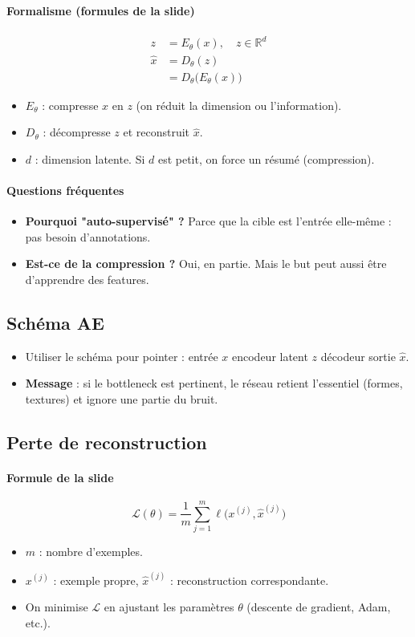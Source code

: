 \documentclass[11pt,a4paper]{article}
\newcommand{\R}{\mathbb{R}}
\begin{document}
\paragraph{Formalisme (formules de la slide)}
\begin{align*}
  z &= E_\theta(x), \quad z \in \R^d \\
  \hat{x} &= D_\theta(z) \\
         &= D_\theta\big(E_\theta(x)\big)
\end{align*}
\begin{itemize}
  \item $E_\theta$ : compresse $x$ en $z$ (on réduit la dimension ou l'information).
  \item $D_\theta$ : décompresse $z$ et reconstruit $\hat{x}$.
  \item $d$ : dimension latente. Si $d$ est petit, on force un résumé (compression).
\end{itemize}

\paragraph{Questions fréquentes}
\begin{itemize}
  \item \textbf{Pourquoi "auto-supervisé" ?} Parce que la cible est l'entrée elle-même : pas besoin d'annotations.
  \item \textbf{Est-ce de la compression ?} Oui, en partie. Mais le but peut aussi être d'apprendre des features.
\end{itemize}

\subsection{Schéma AE}
\begin{itemize}
  \item Utiliser le schéma pour pointer : entrée $x$ \textrightarrow{} encodeur \textrightarrow{} latent $z$ \textrightarrow{} décodeur \textrightarrow{} sortie $\hat{x}$.
  \item \textbf{Message} : si le bottleneck est pertinent, le réseau retient l'essentiel (formes, textures) et ignore une partie du bruit.
\end{itemize}

\subsection{Perte de reconstruction}
\paragraph{Formule de la slide}
\[
  \mathcal{L}(\theta)=\frac{1}{m}\sum_{j=1}^m \ell\big(x^{(j)}, \hat{x}^{(j)}\big)
\]
\begin{itemize}
  \item $m$ : nombre d'exemples.
  \item $x^{(j)}$ : exemple propre, $\hat{x}^{(j)}$ : reconstruction correspondante.
  \item On minimise $\mathcal{L}$ en ajustant les paramètres $\theta$ (descente de gradient, Adam, etc.).
\end{itemize}
\end{document}
